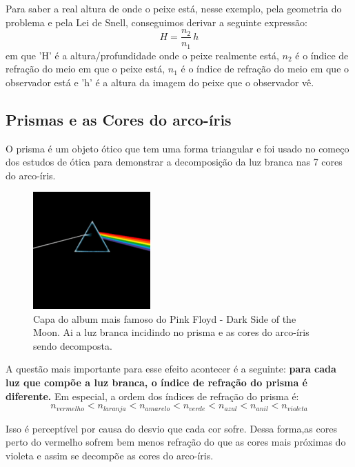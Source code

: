 \documentclass[12pt]{extarticle}
\newcommand{\<}{\langle}
\renewcommand{\>}{\rangle}
\theoremstyle{definition}
\begin{document}
Para saber a real altura de onde o peixe está, nesse exemplo, pela geometria do problema e pela Lei de Snell, conseguimos derivar a seguinte expressão:
\begin{equation}
    H = \frac{n_2}{n_1}\,h
\end{equation}
\noindent em que 'H' é a altura/profundidade onde o peixe realmente está, $n_2$ é o índice de refração do meio em que o peixe está,  $n_1$ é o índice de refração do meio em que o observador está e 'h' é a altura da imagem do peixe que o observador vê.

\subsection{Prismas e as Cores do arco-íris}
O prisma é um objeto ótico que tem uma forma triangular e foi usado no começo dos estudos de ótica para demonstrar a decomposição da luz branca nas 7 cores do arco-íris.
\begin{figure}[H]
    \centering
    \includegraphics[width=0.4\textwidth]{Dark_Side_of_the_Moon.png}
    \caption{Capa do album mais famoso do Pink Floyd - Dark Side of the Moon. Ai a luz branca incidindo no prisma e as cores do arco-íris sendo decomposta.}
    \label{fig:pink_floyd}
\end{figure}

A questão mais importante para esse efeito acontecer é a seguinte: \textbf{para cada luz que compõe a luz branca, o índice de refração do prisma é diferente.} Em especial, a ordem dos índices de refração do prisma é:
\begin{equation}
    n_{vermelho} < n_{laranja} < n_{amarelo} < n_{verde} < n_{azul} < n_{anil} < n_{violeta}
\end{equation}

Isso é perceptível por causa do desvio que cada cor sofre. Dessa forma,as cores perto do vermelho sofrem bem menos refração do que as cores mais próximas do violeta e assim se decompõe as cores do arco-íris.
\end{document}
